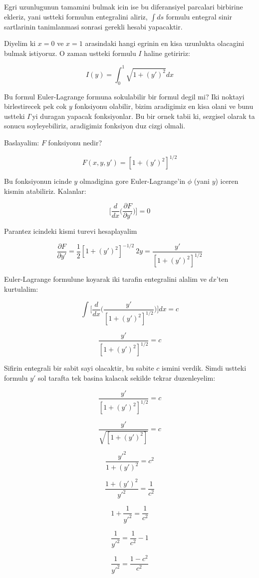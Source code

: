 \documentclass[12pt,fleqn]{article}\usepackage{../common}
\begin{document}
Egri uzunlugunun tamamini bulmak icin ise bu diferansiyel parcalari birbirine
ekleriz, yani ustteki formulun entegralini aliriz, $\int ds$ formulu entegral
sinir sartlarinin tanimlanmasi sonrasi gerekli hesabi yapacaktir.

Diyelim ki $x=0$ ve $x=1$ arasindaki hangi egrinin en kisa uzunlukta olacagini
bulmak istiyoruz. O zaman ustteki formulu $I$ haline getiririz:

\[ I(y) = \int_0^1 \sqrt{1 + (y')^2} dx \]

Bu formul Euler-Lagrange formuna sokulabilir bir formul degil mi? Iki noktayi
birlestirecek pek cok $y$ fonksiyonu olabilir, bizim aradigimiz en kisa olani ve
bunu ustteki $I$'yi duragan yapacak fonksiyonlar. Bu bir ornek tabii ki,
sezgisel olarak ta sonucu soyleyebiliriz, aradigimiz fonksiyon duz cizgi
olmali. 

Baslayalim: $F$ fonksiyonu nedir?

\[ F(x,y,y') = [1+(y')^2]^{1/2} \]

Bu fonksiyonun icinde $y$ olmadigina gore Euler-Lagrange'in $\phi$ (yani $y$)
iceren kismin atabiliriz. Kalanlar:

\[ 
\bigg[
\frac{d}{dx} \bigg( \frac{\partial F}{\partial y'} \bigg)
\bigg] = 0
 \]

Parantez icindeki kismi turevi hesaplayalim

\[ \frac{\partial F}{\partial y'} = \frac{1}{2}[1+(y')^2]^{-1/2}\ 2y = \frac{y'}{[1+(y')^2]^{1/2}} \]

Euler-Lagrange formulune koyarak iki tarafin entegralini alalim ve $dx$'ten
kurtulalim:

\[ 
\int \bigg[
\frac{d}{dx} \bigg( \frac{y'}{[1+(y')^2]^{1/2}} \bigg)
\bigg]dx = c 
 \]

\[ \frac{y'}{[1+(y')^2]^{1/2}}  = c \]

Sifirin entegrali bir sabit sayi olacaktir, bu sabite $c$ ismini verdik. Simdi
ustteki formulu $y'$ sol tarafta tek basina kalacak sekilde tekrar duzenleyelim:

\[ \frac{y'}{[1+(y')^2]^{1/2}}  = c  \]

\[ \frac{y'}{\sqrt{[1+(y')^2]}}  = c  \]

\[ \frac{y'^2}{1+(y')^2}  = c^2 \]

\[ \frac{1+(y')^2}{y'^2}  = \frac{1}{c^2} \]

\[ 1+\frac{1}{y'^2} = \frac{1}{c^2}  \]

\[ \frac{1}{y'^2} = \frac{1}{c^2} - 1 \]

\[ \frac{1}{y'^2} = \frac{1-c^2}{c^2}  \]
\end{document}
